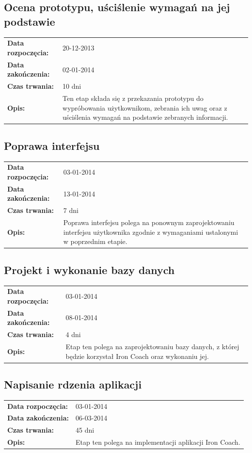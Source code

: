 \subsection{Ocena prototypu, uściślenie wymagań na jej podstawie}
	\begin{tabular}{l p{5cm}}
		\textbf{Data rozpoczęcia:} & 20-12-2013\\
		\textbf{Data zakończenia:} & 02-01-2014\\
		\textbf{Czas trwania:} & 10 dni\\
		\textbf{Opis:} & Ten etap składa się z przekazania prototypu do wypróbowania użytkownikom, zebrania ich uwag oraz z uściślenia wymagań na podstawie zebranych informacji.
	\end{tabular}
\subsection{Poprawa interfejsu}
	\begin{tabular}{l p{5cm}}
		\textbf{Data rozpoczęcia:} & 03-01-2014\\
		\textbf{Data zakończenia:} & 13-01-2014\\
		\textbf{Czas trwania:} & 7 dni\\
		\textbf{Opis:} & Poprawa interfejsu polega na ponownym zaprojektowaniu interfejsu użytkownika zgodnie z wymaganiami ustalonymi w poprzednim etapie.
	\end{tabular}
\subsection{Projekt i wykonanie bazy danych}
	\begin{tabular}{l p{5cm}}
		\textbf{Data rozpoczęcia:} & 03-01-2014\\
		\textbf{Data zakończenia:} & 08-01-2014\\
		\textbf{Czas trwania:} & 4 dni\\
		\textbf{Opis:} & Etap ten polega na zaprojektowaniu bazy danych, z której będzie korzystał Iron Coach oraz wykonaniu jej.
	\end{tabular}
\subsection{Napisanie rdzenia aplikacji}
	\begin{tabular}{l p{5cm}}
		\textbf{Data rozpoczęcia:} & 03-01-2014\\
		\textbf{Data zakończenia:} & 06-03-2014\\
		\textbf{Czas trwania:} & 45 dni\\
		\textbf{Opis:} & Etap ten polega na implementacji aplikacji Iron Coach.
	\end{tabular}
